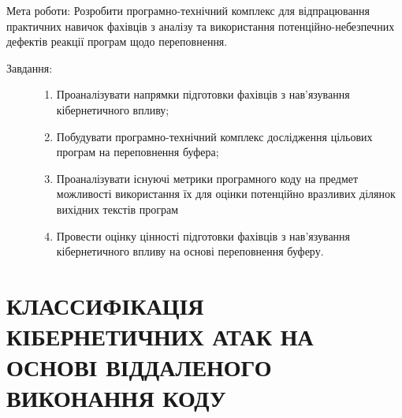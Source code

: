 \documentclass[oneside,final,14pt]{extreport}
\begin{document}
Мета роботи: Розробити програмно-технічний комплекс для відпрацювання практичних навичок фахівців з аналізу та використання потенційно-небезпечних дефектів реакції програм щодо переповнення.
\begin{description}
\item[{Завдання:}] \leavevmode\begin{enumerate}
\item {} 
Проаналізувати напрямки підготовки фахівців з нав’язування кібернетичного впливу;

\item {} 
Побудувати програмно-технічний комплекс дослідження цільових програм на переповнення буфера;

\item {} 
Проаналізувати існуючі метрики програмного коду на предмет можливості використання їх для оцінки потенційно вразливих ділянок вихідних текстів програм

\item {} 
Провести оцінку цінності підготовки фахівців з нав’язування кібернетичного впливу на основі переповнення буферу.

\end{enumerate}

\end{description}
\pagebreak

\section{КЛАССИФІКАЦІЯ КІБЕРНЕТИЧНИХ АТАК НА ОСНОВІ ВІДДАЛЕНОГО ВИКОНАННЯ КОДУ}
\label{1section::doc}\label{1section:id1}
\end{document}
